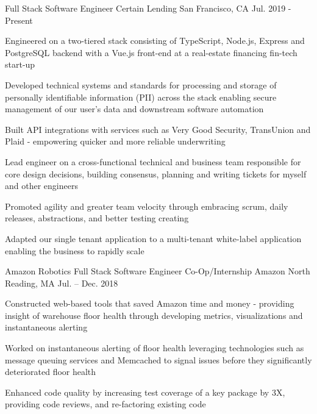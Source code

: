 

 




\begin{cventries}

  \cventry
     {Full Stack Software Engineer}
     {Certain Lending}
     {San Francisco, CA}
     {Jul. 2019 - Present}
     {
       \begin{cvitems}
			\item{Engineered on a two-tiered stack consisting of TypeScript, Node.js, Express and PostgreSQL backend with a Vue.js front-end at a real-estate financing fin-tech start-up}
			\item{Developed technical systems and standards for processing and storage of personally identifiable information (PII) across the stack enabling secure management of our user's data and downstream software automation}
			\item{Built API integrations with services such as Very Good Security, TransUnion and Plaid - empowering quicker and more reliable underwriting}
       		\item{Lead engineer on a cross-functional technical and business team responsible for core design decisions, building consensus, planning and writing tickets for myself and other engineers}
       		\item{Promoted agility and greater team velocity through embracing scrum, daily releases, abstractions, and better testing creating}
       		\item{Adapted our single tenant application to a multi-tenant white-label application enabling the business to rapidly scale}
       \end{cvitems}
     }
	 \cventry
    {Amazon Robotics Full Stack Software Engineer Co-Op/Internship} %
    {Amazon} %
    {North Reading, MA} %
    {Jul. – Dec. 2018} %
    {
    	\begin{cvitems} %
    		    \item {Constructed web-based tools that saved Amazon time and money - providing insight of warehouse floor health through developing metrics, visualizations and instantaneous alerting} 
    			\item {Worked on instantaneous alerting of floor health leveraging technologies such as message queuing services and Memcached to signal issues before they significantly deteriorated floor health} 
    			\item {Enhanced code quality by increasing test coverage of a key package by 3X, providing code reviews, and re-factoring existing code}  			
    		 \end{cvitems}
    }


\end{cventries}
